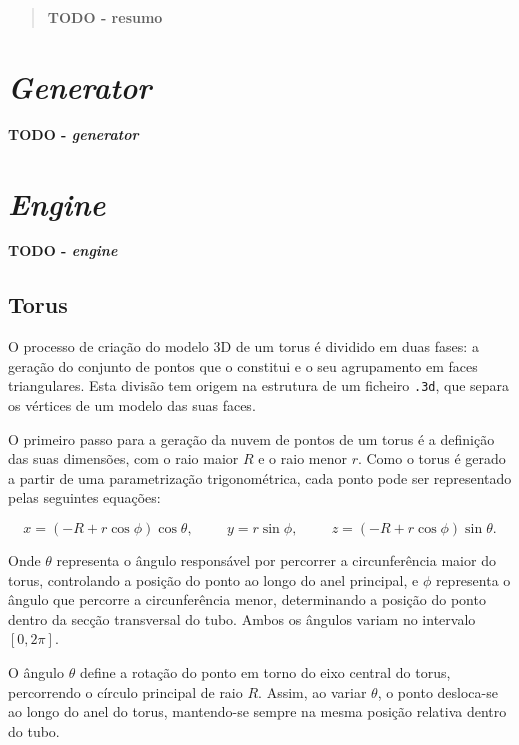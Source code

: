 \documentclass[12pt, a4paper]{article}
\begin{document}
\pagebreak

\begin{abstract}
    \textbf{\color{red} TODO - resumo}
\end{abstract}

\section{\emph{Generator}}

\textbf{\color{red} TODO - \emph{generator}}

\section{\emph{Engine}}

\textbf{\color{red} TODO - \emph{engine}}

\subsection{Torus}

O processo de criação do modelo 3D de um torus é dividido em duas fases: a geração do conjunto de
pontos que o constitui e o seu agrupamento em faces triangulares. Esta divisão tem origem na
estrutura de um ficheiro \texttt{.3d}, que separa os vértices de um modelo das suas faces.

O primeiro passo para a geração da nuvem de pontos de um torus é a definição das suas dimensões,
com o raio maior $R$ e o raio menor $r$. Como o torus é gerado a partir de uma parametrização
trigonométrica, cada ponto pode ser representado pelas seguintes equações:

$$
x = (-R + r \cos \phi) \cos \theta,
\hspace{1cm}
y = r \sin \phi,
\hspace{1cm}
z = (-R + r \cos \phi) \sin \theta.
$$

Onde $\theta$ representa o ângulo responsável por percorrer a circunferência maior do torus,
controlando a posição do ponto ao longo do anel principal, e $\phi$ representa o ângulo que
percorre a circunferência menor, determinando a posição do ponto dentro da secção transversal do
tubo. Ambos os ângulos variam no intervalo $[0, 2\pi]$.

O ângulo $\theta$ define a rotação do ponto em torno do eixo central do torus, percorrendo o
círculo principal de raio $R$. Assim, ao variar $\theta$, o ponto desloca-se ao longo do anel do
torus, mantendo-se sempre na mesma posição relativa dentro do tubo.
\end{document}
